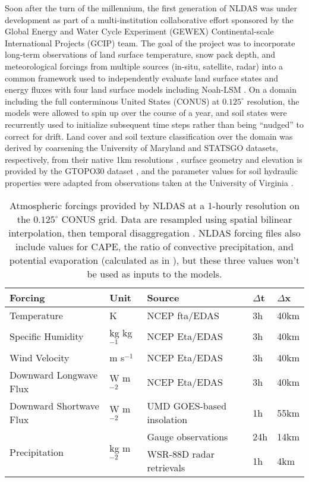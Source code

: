 Soon after the turn of the millennium, the first generation of NLDAS was under development as part of a multi-institution collaborative effort sponsored by the Global Energy and Water Cycle Experiment (GEWEX) Continental-scale International Projects (GCIP) team. The goal of the project was to incorporate long-term observations of land surface temperature, snow pack depth, and meteorological forcings from multiple sources (in-situ, satellite, radar) into a common framework used to independently evaluate land surface states and energy fluxes with four land surface models including Noah-LSM \citep{mitchell_multi-institution_2004}. On a domain including the full conterminous United States (CONUS) at $0.125^\circ$ resolution, the models were allowed to spin up over the course of a year, and soil states were recurrently used to initialize subsequent time steps rather than being ``nudged'' to correct for drift. Land cover and soil texture classification over the domain was derived by coarsening the University of Maryland and STATSGO datasets, respectively, from their native 1km resolutions \citep{hansen_global_2000}, surface geometry and elevation is provided by the GTOPO30 dataset \citep{earth_resources_observation_and_science_centeru_s_geological_surveyu_s_department_of_the_interior_usgs_1997}, and the parameter values for soil hydraulic properties were adapted from observations taken at the University of Virginia \citep{cosby_statistical_1984}.

\begin{table}[h!]
    \centering
    \begin{tabular}{ l l l l l}
        Forcing & Unit & Source & $\Delta$t & $\Delta$x \\
        \hline
        Temperature & K & NCEP fta/EDAS & 3h & 40km \\
        Specific Humidity & kg kg$^{-1}$ & NCEP Eta/EDAS & 3h & 40km \\
        Wind Velocity & m s$^{-1}$ & NCEP Eta/EDAS & 3h & 40km \\
        Downward Longwave Flux & W m$^{-2}$ & NCEP Eta/EDAS & 3h & 40km \\
        Downward Shortwave Flux & W m$^{-2}$ & UMD GOES-based insolation & 1h & 55km \\
        \multirow{2}{*}{Precipitation} & \multirow{2}{*}{kg m$^{-2}$} & Gauge observations & 24h & 14km \\[-12pt]
        & & WSR-88D radar retrievals & 1h & 4km \\
    \end{tabular}
    \caption{Atmospheric forcings provided by NLDAS at a 1-hourly resolution on the $0.125^\circ$ CONUS grid. Data are resampled using spatial bilinear interpolation, then temporal disaggregation \cite{mitchell_multi-institution_2004}. NLDAS forcing files also include values for CAPE, the ratio of convective precipitation, and potential evaporation (calculated as in \cite{mahrt_influence_1984}), but these three values won't be used as inputs to the models.}
    \label{forcing}
\end{table}

